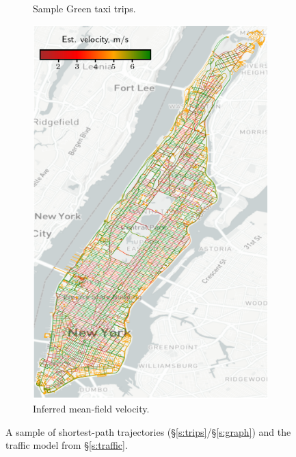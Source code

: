 \documentclass[12pt,notitlepage]{article}
\begin{document}
\begin{figure}[!p]
\begin{subfigure}{0.32\linewidth}
		\caption{Sample Green taxi trips.}
	\end{subfigure}
	\hfill
	\begin{subfigure}{0.32\linewidth}
		\includegraphics[width=\textwidth]{20210613-GraphWithLag/b_train/v1/lag/H=18/UTC-20210615-132827/train/velocity_i=9.png}
		
		\caption{Inferred mean-field velocity.}
		\label{f:mfv}
	\end{subfigure}
		
	\vspace{0.25\baselineskip}%
	\vspace{-0.25\baselineskip}

	\caption{%
		A sample of shortest-path trajectories (\S\ref{s:trips}/\S\ref{s:graph})
		and
		the traffic model from \S\ref{s:traffic}.
	}
			
\end{figure}
\end{document}
